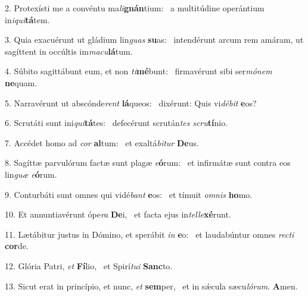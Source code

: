 2. Protexísti me a convéntu ma\textit{li}\textbf{gnán}tium: \ast\  a multitúdine operántium in\textit{i}\textit{qui}\textbf{tá}tem.\

3. Quia exacuérunt ut gládium lin\textit{guas} \textbf{su}as: \ast\  intendérunt arcum rem amáram, ut sagíttent in occúltis im\textit{ma}\textit{cu}\textbf{lá}tum.\

4. Súbito sagittábunt eum, et non \textit{ti}\textbf{mé}bunt: \ast\  firmavérunt sibi ser\textit{mó}\textit{nem} \textbf{ne}quam.\

5. Narravérunt ut abscónde\textit{rent} \textbf{lá}queos: \ast\  dixérunt: Quis vi\textit{dé}\textit{bit} \textbf{e}os?\

6. Scrutáti sunt ini\textit{qui}\textbf{tá}tes: \ast\  defecérunt scrután\textit{tes} \textit{scru}\textbf{tí}nio.\

7. Accédet homo ad \textit{cor} \textbf{al}tum: \ast\  et exaltá\textit{bi}\textit{tur} \textbf{De}us.\

8. Sagíttæ parvulórum factæ sunt plagæ \textit{e}\textbf{ó}rum: \ast\  et infirmátæ sunt contra eos lin\textit{guæ} \textit{e}\textbf{ó}rum.\

9. Conturbáti sunt omnes qui vidé\textit{bant} \textbf{e}os: \ast\  et tímuit \textit{om}\textit{nis} \textbf{ho}mo.\

10. Et annuntiavérunt ópe\textit{ra} \textbf{De}i, \ast\  et facta ejus in\textit{tel}\textit{le}\textbf{xé}runt.\

11. Lætábitur justus in Dómino, et sperábit \textit{in} \textbf{e}o: \ast\  et laudabúntur omnes \textit{rec}\textit{ti} \textbf{cor}de.\

12. Glória Patri, \textit{et} \textbf{Fí}lio, \ast\  et Spirí\textit{tu}\textit{i} \textbf{Sanc}to.\

13. Sicut erat in princípio, et nunc, \textit{et} \textbf{sem}per, \ast\  et in sǽcula sæcu\textit{ló}\textit{rum}. \textbf{A}men.\

